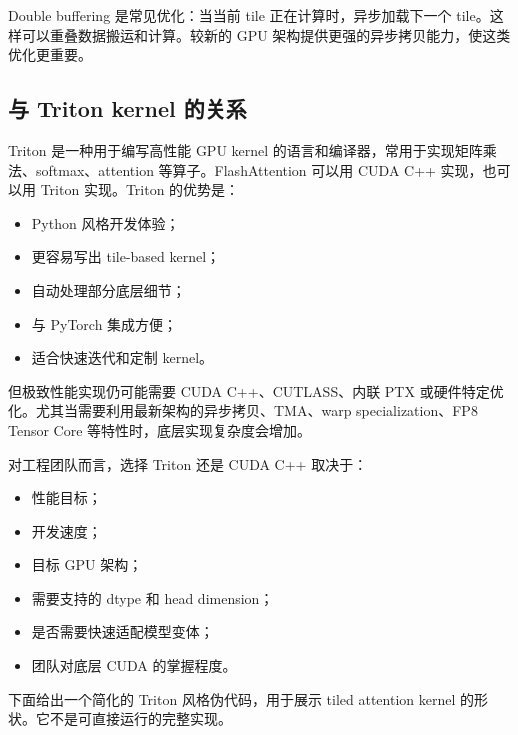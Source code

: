 Double buffering 是常见优化：当当前 tile 正在计算时，异步加载下一个 tile。这样可以重叠数据搬运和计算。较新的 GPU 架构提供更强的异步拷贝能力，使这类优化更重要。

\subsection{与 Triton kernel 的关系}
\label{subsec:flashattention-and-triton}

Triton 是一种用于编写高性能 GPU kernel 的语言和编译器，常用于实现矩阵乘法、softmax、attention 等算子。FlashAttention 可以用 CUDA C++ 实现，也可以用 Triton 实现。Triton 的优势是：

\begin{itemize}
\item Python 风格开发体验；
\item 更容易写出 tile-based kernel；
\item 自动处理部分底层细节；
\item 与 PyTorch 集成方便；
\item 适合快速迭代和定制 kernel。
\end{itemize}

但极致性能实现仍可能需要 CUDA C++、CUTLASS、内联 PTX 或硬件特定优化。尤其当需要利用最新架构的异步拷贝、TMA、warp specialization、FP8 Tensor Core 等特性时，底层实现复杂度会增加。

对工程团队而言，选择 Triton 还是 CUDA C++ 取决于：

\begin{itemize}
\item 性能目标；
\item 开发速度；
\item 目标 GPU 架构；
\item 需要支持的 dtype 和 head dimension；
\item 是否需要快速适配模型变体；
\item 团队对底层 CUDA 的掌握程度。
\end{itemize}

下面给出一个简化的 Triton 风格伪代码，用于展示 tiled attention kernel 的形状。它不是可直接运行的完整实现。

